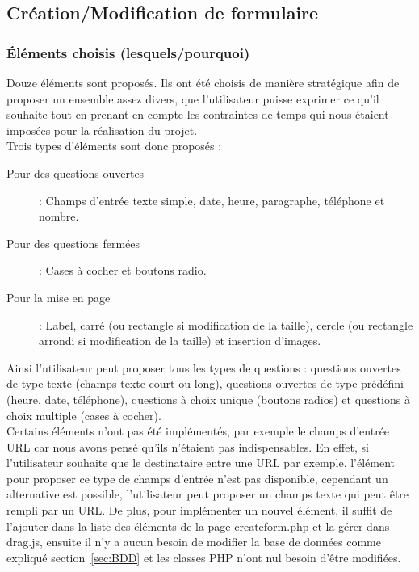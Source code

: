 \documentclass{sigplanconf}
\begin{document}
\subsection{Création/Modification de formulaire}
\subsubsection{Éléments choisis (lesquels/pourquoi)}
Douze éléments sont proposés. Ils ont été choisis de manière stratégique afin de proposer un ensemble assez divers, que l’utilisateur puisse exprimer ce qu’il souhaite tout en prenant en compte les contraintes de temps qui nous étaient imposées pour la réalisation du projet.\\
Trois types d'éléments sont donc proposés :
\begin{description}
\item [Pour des questions ouvertes] : Champs d'entrée texte simple, date, heure, paragraphe, téléphone et nombre.
\item [Pour des questions fermées] : Cases à cocher et boutons radio.
\item [Pour la mise en page] : Label, carré (ou rectangle si modification de la taille), cercle (ou rectangle arrondi si modification de la taille) et insertion d'images.
\end{description}
Ainsi l’utilisateur peut proposer tous les types de questions : questions ouvertes de type texte (champs texte court ou long), questions ouvertes de type prédéfini (heure, date, téléphone), questions à choix unique (boutons radios) et questions à choix multiple (cases à cocher).\\
Certains éléments n'ont pas été implémentés, par exemple le champs d'entrée URL car nous avons pensé qu'ils n'étaient pas indispensables. En effet, si l'utilisateur souhaite que le destinataire entre une URL par exemple, l'élément pour proposer ce type de champs d'entrée n'est pas disponible, cependant un alternative est possible, l'utilisateur peut proposer un champs texte qui peut être rempli par un URL. De plus, pour implémenter un nouvel élément, il suffit de l'ajouter dans la liste des éléments de la page createform.php et la gérer dans drag.js, ensuite il n'y a aucun besoin de modifier la base de données comme expliqué section~\ref{sec:BDD} et les classes PHP n'ont nul besoin d'être modifiées.
\end{document}
